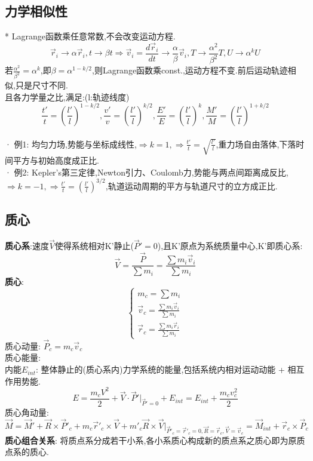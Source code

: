 \documentclass{article}
\begin{document}
\subsection{力学相似性}
* Lagrange函数乘任意常数,不会改变运动方程.
\[\vec r_i \to \alpha \vec r_i, t \to \beta t 
\Rightarrow \vec v_i = \frac{d\vec r_i}{dt} \to \frac{\alpha}{\beta}\vec v_i,T \to \frac{\alpha^2}{\beta^2}T,U \to  \alpha^k U\]
若$\frac{\alpha^2}{\beta^2} = \alpha ^ k $,即$\beta = \alpha^{1-k/2}$,则Lagrange函数乘const.,运动方程不变.前后运动轨迹相似,只是尺寸不同.\\
且各力学量之比,满足:\quad(l:轨迹线度)
\[\frac{t'}{t} = (\frac{l'}{l})^{1-k/2},\frac{v'}{v} = (\frac{l'}{l})^{k/2},\frac{E'}{E} = (\frac{l'}{l})^k,\frac{M'}{M} = (\frac{l'}{l})^{1+k/2}\]\\
· 例1: 均匀力场,势能与坐标成线性,$\Rightarrow k=1,\Rightarrow \frac{t'}{t} = \sqrt{\frac{l'}{l}}$,重力场自由落体,下落时间平方与初始高度成正比.\\
· 例2: Kepler's第三定律,Newton引力、Coulomb力,势能与两点间距离成反比,$\Rightarrow k=-1,\Rightarrow \frac{t'}{t} = (\frac{l'}{l})^{3/2}$,轨道运动周期的平方与轨道尺寸的立方成正比.


\subsection{质心}
\textbf{质心系}:\exists 速度$\vec V$使得系统相对K'静止($\vec P' = 0$),且K'原点为系统质量中心,K'即质心系:
\[\vec V = \frac{\vec P}{\sum m_i} = \frac{\sum m_i \vec v_i}{\sum m_i}\]
\textbf{质心}: 
\begin{displaymath}
    \left\{ \begin{array}{ll}
    m_c = \sum m_i\\
    \vec v_c = \frac{\sum m_i \vec v_i}{\sum m_i}\\
    \vec r_c = \frac{\sum m_i \vec r_i}{\sum m_i}
    \end{array} \right.
\end{displaymath}
质心动量: $\vec P_c = m_c \vec v_c$\\
质心能量: \\
内能$E_{int}$: 整体静止的(质心系内)力学系统的能量,包括系统内相对运动动能 + 相互作用势能.\\
\[E = \frac{m_c V^2}{2} + \vec V \cdot \vec P' |_{\vec P'=0} + E_{int} = E_{int} + \frac{m_c v_c^2}{2}\]
质心角动量: 
\[\vec M = \vec M' + \vec R \times \vec P'_c + m_c \vec r'_c \times \vec V + m'_c \vec R \times \vec V|_{\vec P'_c =\vec r'_c = 0, \vec R =\vec r_c, \vec V =\vec v_c} = \vec M_{int} + \vec r_c \times \vec P_c \]
\textbf{质心组合关系}: 将质点系分成若干小系,各小系质心构成新的质点系之质心即为原质点系的质心.
\end{document}
